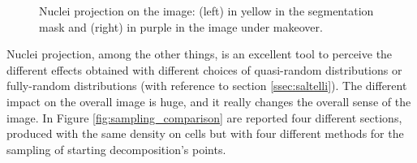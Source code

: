 \documentclass[12pt,a4paper]{report}
\begin{document}
\begin{description}
\begin{figure}
\begin{subfigure}[t]{0.2\textwidth}
                 \label{fig:nuclei_real}
            \end{subfigure}
            \caption{Nuclei projection on the image: (left) in yellow in the segmentation mask and (right) in purple in the image under makeover.}
            \label{fig:nuclei_proj}
        \end{figure}

        Nuclei projection, among the other things, is an excellent tool to perceive the different effects obtained with different choices of quasi-random distributions or fully-random distributions (with reference to section \ref{ssec:saltelli}). The different impact on the overall image is huge, and it really changes the overall sense of the image. In Figure \ref{fig:sampling_comparison} are reported four different sections, produced with the same density on cells but with four different methods for the sampling of starting decomposition's points.


\end{description}
\end{document}
